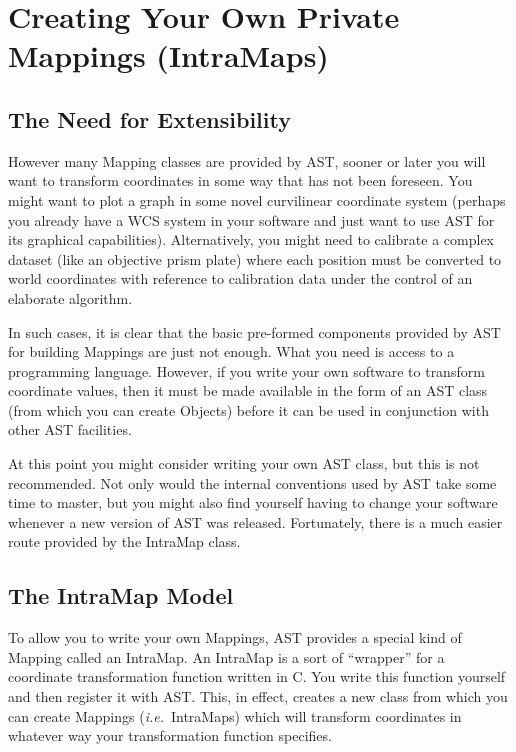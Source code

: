 \documentclass[twoside,11pt]{article}
\newcommand{\htmlref}[2]{#1}
\begin{document}
\cleardoublepage
%
\section{\label{ss:intramaps}Creating Your Own Private Mappings (IntraMaps)}

\subsection{The Need for Extensibility}

However many \htmlref{Mapping}{Mapping} classes are provided by AST, sooner or later you
will want to transform coordinates in some way that has not been
foreseen. You might want to plot a graph in some novel curvilinear
coordinate system (perhaps you already have a WCS system in your
software and just want to use AST for its graphical capabilities).
Alternatively, you might need to calibrate a complex dataset (like an
objective prism plate) where each position must be converted to world
coordinates with reference to calibration data under the control of an
elaborate algorithm.

In such cases, it is clear that the basic pre-formed components
provided by AST for building Mappings are just not enough. What you
need is access to a programming language. However, if you write your
own software to transform coordinate values, then it must be made
available in the form of an AST class (from which you can create
Objects) before it can be used in conjunction with other AST
facilities.

At this point you might consider writing your own AST class, but this
is not recommended. Not only would the internal conventions used by
AST take some time to master, but you might also find yourself having
to change your software whenever a new version of AST was
released. Fortunately, there is a much easier route provided by the
\htmlref{IntraMap}{IntraMap} class.

\subsection{The IntraMap Model}

To allow you to write your own Mappings, AST provides a special kind
of \htmlref{Mapping}{Mapping} called an \htmlref{IntraMap}{IntraMap}. An IntraMap is a sort of ``wrapper''
for a coordinate transformation function written in C. You write this
function yourself and then register it with AST. This, in effect,
creates a new class from which you can create Mappings
({\em{i.e.}}\ IntraMaps) which will transform coordinates in whatever
way your transformation function specifies.
\end{document}
